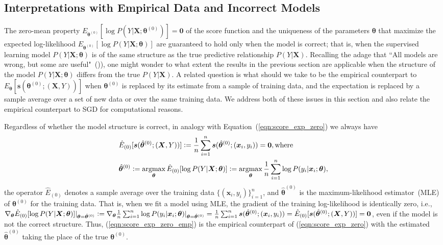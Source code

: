 \documentclass[twoside,11pt]{article}
\DeclareMathOperator*{\argmax}{argmax} %
\begin{document}
\subsection{Interpretations with Empirical Data and Incorrect Models}
\label{ss:sgd_score}
The zero-mean property $E_{\bm{\theta}^{(0)}}[\log{P(Y|\bm{X}; \bm{\theta}^{(0)})}] = \textbf{0}$ of the score function and the uniqueness of the parameters $\bm{\theta}$ that maximize the expected log-likelihood $E_{\bm{\theta}^{(0)}}[\log P(Y|\bm{X}; \bm{\theta})]$ are guaranteed to hold only when the model is correct; that is, when the supervised learning model $P(Y|\bm{X};\bm{\theta})$ is of the same structure as the true predictive relationship $P(Y|\bm{X})$. Recalling the adage that ``All models are wrong, but some are useful"~(\cite{box1976science})), one might wonder to what extent the results in the previous section are applicable when the structure of the model $P(Y|\bm{X};\bm{\theta})$ differs from the true $P(Y|\bm{X})$. A related question is what should we take to be the empirical counterpart to $E_{\bm{\theta}}[\bm{s}(\bm{\theta}^{(0)};(\bm{X},Y) )]$ when $\bm{\theta}^{(0)}$ is replaced by its estimate from a sample of training data, and the expectation is replaced by a sample average over a set of new data or over the same training data. We address both of these issues in this section and also relate the empirical counterpart to SGD for computational reasons. 

Regardless of whether the model structure is correct, in analogy with Equation~(\ref{eqn:score_exp_zero}) we always have
\begin{align}
\begin{aligned}
&\hat{E}_{(0)}[\bm{s}(\hat{\bm{\theta}}^{(0)};(\bm{X}, Y))] \vcentcolon=\frac{1}{n}\sum_{i=1}^{n}\bm{s}(\hat{\bm{\theta}}^{(0)};(\bm{x}_i, y_i))=\bm{0}, \text{where} \\
&\hat{\bm{\theta}}^{(0)} \vcentcolon =  \argmax_{\bm{\theta}}\hat{E}_{(0)}[\log{P(Y|\bm{X}; \bm{\theta})}] \vcentcolon= \argmax_{\bm{\theta}}\frac{1}{n}\sum_{i=1}^n \log{P(y_i|\bm{x}_i;\bm{\theta})},
\end{aligned}
\label{eqn:score_exp_zero_emp}
\end{align}   
the operator $\hat{E}_{(0)}$ denotes a sample average over the training data $\{(\bm{x}_i, y_i)\}_{i=1}^n$, and $\hat{\bm{\theta}}^{(0)}$ is the maximum-likelihood estimator~(MLE) of $\bm{\theta}^{(0)}$ for the training data. That is, when we fit a model using MLE, the gradient of the training log-likelihood is identically zero, i.e., $\nabla_{\bm{\theta}}\hat{E}_{(0)}[\log{P(Y|\bm{X}; {\bm{\theta}})}]|_{\bm{\theta}=\hat{\bm{\theta}}^{(0)}} \vcentcolon=\nabla_{\bm{\theta}}\frac{1}{n}\sum_{i=1}^n \log{P(y_i|\bm{x}_i;{\bm{\theta}})|_{\bm{\theta}=\hat{\bm{\theta}}^{(0)}}}=\frac{1}{n}\sum_{i=1}^n\bm{s}(\hat{\bm{\theta}}^{(0)};(\bm{x}_i, y_i)) = \hat{E}_{(0)}[\bm{s}(\hat{\bm{\theta}}^{(0)};(\bm{X}, Y))]=\bm{0}$, even if the model is not the correct structure. Thus, (\ref{eqn:score_exp_zero_emp}) is the empirical counterpart of (\ref{eqn:score_exp_zero}) with the estimated $\hat{\bm{\theta}}^{(0)}$ taking the place of the true $\bm{\theta}^{(0)}$. 
\end{document}
